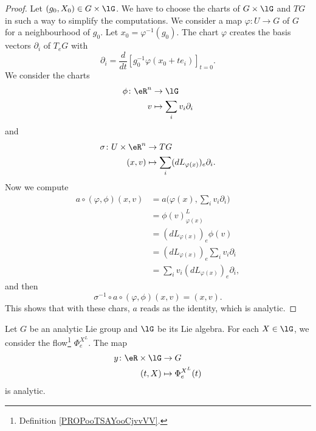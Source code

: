 \begin{proof}
	Let \( (g_0,X_0)\in G\times \lG\). We have to choose the charts of \( G\times \lG\) and \( TG\) in such a way to simplify the computations. We consider a map \(\varphi \colon U\to G  \) of \( G\) for a neighbourhood of \( g_0\). Let \( x_0=\varphi^{-1}(g_0)\). The chart \( \varphi\) creates the basis vectors \( \partial_i\) of \( T_eG\) with
	\begin{equation}
		\partial_i=\frac{d}{dt} \left[ g_0^{-1}\varphi(x_0+te_i)  \right]_{t=0}.
	\end{equation}
	We consider the charts
	\begin{equation}
		\begin{aligned}
			\phi\colon \eR^n & \to \lG                     \\
			v                & \mapsto \sum_iv_i\partial_i
		\end{aligned}
	\end{equation}
	and
	\begin{equation}
		\begin{aligned}
			\sigma\colon U\times \eR^n & \to TG                                       \\
			(x,v)                      & \mapsto \sum_i(dL_{\varphi(x)})_e\partial_i.
		\end{aligned}
	\end{equation}
	Now we compute
	\begin{subequations}
		\begin{align}
			a\circ(\varphi,\phi)(x,v) & =a\Big( \varphi(x),\sum_iv_i\partial_i \Big) \\
			                          & =\phi(v)^L_{\varphi(x)}                      \\
			                          & =(dL_{\varphi(x)})_e\phi(v)                  \\
			                          & =(dL_{\varphi(x)})_e\sum_iv_i\partial_i      \\
			                          & =\sum_iv_i(dL_{\varphi(x)})_e\partial_i,
		\end{align}
	\end{subequations}
	and then
	\begin{equation}
		\sigma^{-1}\circ a\circ(\varphi,\phi)(x,v)=(x,v).
	\end{equation}
	This shows that with these chars, \( a\) reads as the identity, which is analytic.
\end{proof}


\begin{proposition}	\label{PROPooDKLRooNahSXV}
	Let \( G\) be an analytic Lie group and \( \lG\) be its Lie algebra. For each \( X\in \lG\), we consider the flow\footnote{Definition \ref{PROPooTSAYooCjvvVV}.} \( \Phi_e^{X^L}\). The map
	\begin{equation}
		\begin{aligned}
			y\colon \eR\times \lG & \to G                   \\
			(t,X)                 & \mapsto \Phi_e^{X^L}(t)
		\end{aligned}
	\end{equation}
	is analytic.
\end{proposition}

